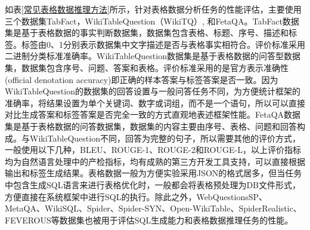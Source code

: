 如表\ref{常见表格数据推理方法}所示，针对表格数据分析任务的性能评估，主要使用三个数据集TabFact\cite{chenTabFactLargescaleDataset2020}，WikiTableQuestion\cite{pasupatCompositionalSemanticParsing2015}（WikiTQ）, 和FetaQA\cite{nanFetaqaFreeformTable2022a}。TabFact数据集是基于表格数据的事实判断数据集，数据集包含表格、标题、序号、描述和标签。标签由0、1分别表示数据集中文字描述是否与表格事实相符合。评价标准采用二进制分类标准准确率。WikiTableQuestion数据集是基于表格数据的问答型数据集，数据集包含序号、问题、答案和表格。评价标准采用的是官方表示准确性(official denotation accuracy)即正确的样本答案与标签答案是否一致。因为WikiTableQuestion的数据集的回答设置与一般问答任务不同，为方便统计框架的准确率，将结果设置为单个关键词、数字或词组，而不是一个语句，所以可以直接对比生成答案和标签答案是否完全一致的方式直观地表述框架性能。FetaQA数据集是基于表格数据的问答数据集，数据集的内容主要由序号、表格、问题和回答构成。与WikiTableQuestion不同，回答为完整的句子，所以需要其他的评价方式，一般使用以下几种，BLEU、ROUGE-1、ROUGE-2和ROUGE-L，以上评价指标均为自然语言处理中的产检指标，均有成熟的第三方开发工具支持，可以直接根据输出和标签生成结果。表格数据一般为方便实验采用JSON的格式居多，但当任务中包含生成SQL语言来进行表格优化时，一般都会将表格预处理为DB文件形式，方便直接在系统框架中进行SQL的执行。除此之外，WebQuestionsSP\cite{yihValueSemanticParse2016}、MetaQA\cite{zhangVariationalReasoningQuestion2018}、WikiSQL\cite{zhongSeq2SQLGeneratingStructured2017}、Spider\cite{yuSpiderLargeScaleHumanLabeled2019}、Spider-SYN\cite{ganRobustnessTexttoSQLModels2021}、Open-WikiTable\cite{kweonOpenWikiTableDatasetOpen2023}、SpiderRealistic\cite{dengStructureGroundedPretrainingTexttoSQL2021}、FEVEROUS\cite{alyFEVEROUSFactExtraction2021}等数据集也被用于评估SQL生成能力和表格数据推理任务的性能。

